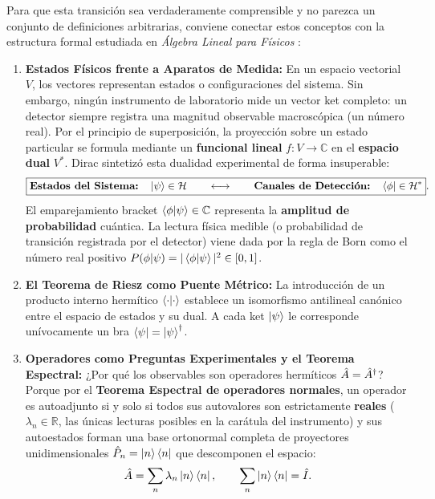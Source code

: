 Para que esta transición sea verdaderamente comprensible y no parezca un conjunto de definiciones arbitrarias, conviene conectar estos conceptos con la estructura formal estudiada en \textit{Álgebra Lineal para Físicos} \cite{sakurai}:
\begin{enumerate}
    \item \textbf{Estados Físicos frente a Aparatos de Medida:}
    En un espacio vectorial $V$, los vectores representan estados o configuraciones del sistema. Sin embargo, ningún instrumento de laboratorio mide un vector ket completo: un detector siempre registra una magnitud observable macroscópica (un número real).
    Por el principio de superposición, la proyección sobre un estado particular se formula mediante un \textbf{funcional lineal} $f: V \to \mathbb{C}$ en el \textbf{espacio dual} $V^*$.
    Dirac sintetizó esta dualidad experimental de forma insuperable:
    \begin{equation}
        \boxed{\text{\textbf{Estados del Sistema:}} \quad \left| \psi \right\rangle \in \mathcal{H} \qquad \longleftrightarrow \qquad \text{\textbf{Canales de Detección:}} \quad \left\langle \phi \right| \in \mathcal{H}^*}.
    \end{equation}
    El emparejamiento bracket $\left\langle \phi \middle| \psi \right\rangle \in \mathbb{C}$ representa la \textbf{amplitud de probabilidad} cuántica. La lectura física medible (o probabilidad de transición registrada por el detector) viene dada por la regla de Born como el número real positivo $P(\phi|\psi) = |\left\langle \phi \middle| \psi \right\rangle|^2 \in [0, 1]$.

    \item \textbf{El Teorema de Riesz como Puente Métrico:}
    La introducción de un producto interno hermítico $\left\langle \cdot \middle| \cdot \right\rangle$ establece un isomorfismo antilineal canónico entre el espacio de estados y su dual. A cada ket $\left| \psi \right\rangle$ le corresponde unívocamente un bra $\left\langle \psi \right| = \left| \psi \right\rangle^\dagger$.

    \item \textbf{Operadores como Preguntas Experimentales y el Teorema Espectral:}
    ¿Por qué los observables son operadores hermíticos $\hat{A} = \hat{A}^\dagger$?
    Porque por el \textbf{Teorema Espectral de operadores normales}, un operador es autoadjunto si y solo si todos sus autovalores son estrictamente \textbf{reales} ($\lambda_n \in \mathbb{R}$, las únicas lecturas posibles en la carátula del instrumento) y sus autoestados forman una base ortonormal completa de proyectores unidimensionales $\hat{P}_n = \left| n \right\rangle\left\langle n \right|$ que descomponen el espacio:
    \begin{equation}
        \hat{A} = \sum_n \lambda_n \left| n \right\rangle\left\langle n \right|, \qquad \sum_n \left| n \right\rangle\left\langle n \right| = \hat{I}.
    \end{equation}


\end{enumerate}
